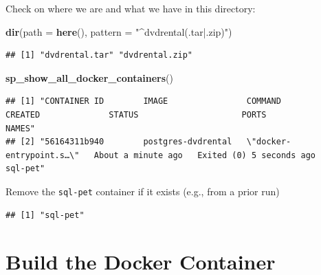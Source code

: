 \documentclass[]{book}
\newenvironment{Shaded}{\begin{snugshade}}{\end{snugshade}}
\newcommand{\ControlFlowTok}[1]{\textcolor[rgb]{0.13,0.29,0.53}{\textbf{#1}}}
\newcommand{\DataTypeTok}[1]{\textcolor[rgb]{0.13,0.29,0.53}{#1}}
\newcommand{\KeywordTok}[1]{\textcolor[rgb]{0.13,0.29,0.53}{\textbf{#1}}}
\newcommand{\NormalTok}[1]{#1}
\newcommand{\OperatorTok}[1]{\textcolor[rgb]{0.81,0.36,0.00}{\textbf{#1}}}
\newcommand{\OtherTok}[1]{\textcolor[rgb]{0.56,0.35,0.01}{#1}}
\newcommand{\StringTok}[1]{\textcolor[rgb]{0.31,0.60,0.02}{#1}}
\theoremstyle{definition}
\theoremstyle{definition}
\theoremstyle{definition}
\theoremstyle{remark}
\begin{document}
Check on where we are and what we have in this directory:

\begin{Shaded}
\begin{Highlighting}[]
\KeywordTok{dir}\NormalTok{(}\DataTypeTok{path =} \KeywordTok{here}\NormalTok{(), }\DataTypeTok{pattern =} \StringTok{"^dvdrental(.tar|.zip)"}\NormalTok{)}
\end{Highlighting}
\end{Shaded}

\begin{verbatim}
## [1] "dvdrental.tar" "dvdrental.zip"
\end{verbatim}

\begin{Shaded}
\begin{Highlighting}[]
\KeywordTok{sp_show_all_docker_containers}\NormalTok{()}
\end{Highlighting}
\end{Shaded}

\begin{verbatim}
## [1] "CONTAINER ID        IMAGE                COMMAND                  CREATED              STATUS                     PORTS               NAMES"    
## [2] "56164311b940        postgres-dvdrental   \"docker-entrypoint.s…\"   About a minute ago   Exited (0) 5 seconds ago                       sql-pet"
\end{verbatim}

Remove the \texttt{sql-pet} container if it exists (e.g., from a prior
run)

\begin{Shaded}
\end{Shaded}

\begin{verbatim}
## [1] "sql-pet"
\end{verbatim}

\hypertarget{build-the-docker-container}{%
\section{Build the Docker Container}\label{build-the-docker-container}}
\end{document}
